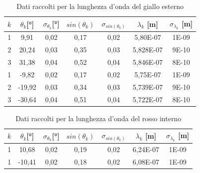 \documentclass{article}
\begin{document}
        \begin{table}[H]

            \centering

            \begin{tabular}{c c c c c c c}

                \toprule 
                $k$ & $\theta_k$[°] & $\sigma_{\theta_k}$[°] & $sin(\theta_k)$ & $\sigma_{sin(\theta_k)}$ & $\lambda_k$ [m] & $\sigma_{\lambda_k}$ [m] \\
                
                \midrule
                1	&	9,91	&	0,02	&	0,17	&	0,02	&	5,80E-07	&	1E-09\\
                2	&	20,24	&	0,03	&	0,35	&	0,03	&	5,828E-07	&	9E-10\\
                3	&	31,38	&	0,04	&	0,52	&	0,04	&	5,846E-07	&	8E-10\\
                1	&	-9,82	&	0,02	&	0,17	&	0,02	&	5,75E-07	&	1E-09\\
                2	&	-19,92	&	0,03	&	0,34	&	0,03	&	5,739E-07	&	9E-10\\
                3	&	-30,64	&	0,04	&	0,51	&	0,04	&	5,722E-07	&	8E-10\\
                \bottomrule

            \end{tabular}

            \caption{Dati raccolti per la lunghezza d'onda del giallo esterno}
        
        \end{table}
        \label{table:giallo est}

        \begin{table}[H]

            \centering

            \begin{tabular}{c c c c c c c}
                
                \toprule 
                $k$ & $\theta_k$[°] & $\sigma_{\theta_k}$[°] & $sin(\theta_k)$ & $\sigma_{sin(\theta_k)}$ & $\lambda_k$ [m] & $\sigma_{\lambda_k}$ [m] \\
                
                \midrule
                1	&	10,68	&	0,02	&	0,19	&	0,02	&	6,24E-07	&	1E-09\\
                1	&	-10,41	&	0,02	&	0,18	&	0,02	&	6,08E-07	&	1E-09\\
                \bottomrule

            \end{tabular}

            \caption{Dati raccolti per la lunghezza d'onda del rosso interno}

        \end{table}
        \label{table:rosso int}
        
\end{document}
